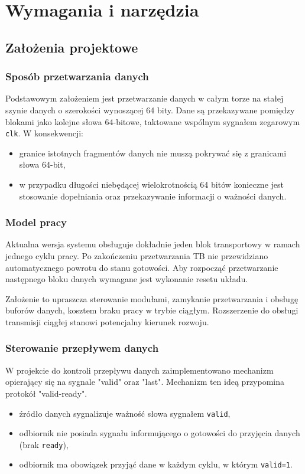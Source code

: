 \chapter{Wymagania i narzędzia}
\label{ch:wymagania-i-narzedzia}

\section{Założenia projektowe}
\label{sec:zalozenia_projektowe}

\subsection{Sposób przetwarzania danych}
Podstawowym założeniem jest przetwarzanie danych w całym torze na stałej szynie danych o szerokości wynoszącej 64 bity. Dane są przekazywane pomiędzy blokami jako kolejne słowa 64-bitowe, taktowane wspólnym sygnałem zegarowym \texttt{clk}. W konsekwencji:
\begin{itemize}
    \item granice istotnych fragmentów danych nie muszą pokrywać się z granicami słowa 64-bit,
    \item w przypadku długości niebędącej wielokrotnością 64 bitów konieczne jest stosowanie dopełniania oraz przekazywanie informacji o ważności danych.
\end{itemize}

\subsection{Model pracy}
Aktualna wersja systemu obsługuje dokładnie jeden blok transportowy w ramach jednego cyklu pracy. Po zakończeniu przetwarzania TB nie przewidziano automatycznego powrotu do stanu gotowości. Aby rozpocząć przetwarzanie następnego bloku danych wymagane jest wykonanie resetu układu.

Założenie to upraszcza sterowanie modułami, zamykanie przetwarzania i obsługę buforów danych, kosztem braku pracy w trybie ciągłym. Rozszerzenie do obsługi transmisji ciągłej stanowi potencjalny kierunek rozwoju.

\subsection{Sterowanie przepływem danych}
W projekcie do kontroli przepływu danych zaimplementowano mechanizm opierający się na sygnale "valid" oraz "last". Mechanizm ten ideą przypomina protokół "valid-ready". 
\begin{itemize}
    \item źródło danych sygnalizuje ważność słowa sygnałem \texttt{valid},
    \item odbiornik nie posiada sygnału informującego o gotowości do przyjęcia danych (brak \texttt{ready}),
    \item odbiornik ma obowiązek przyjąć dane w każdym cyklu, w którym \texttt{valid=1}.
\end{itemize}

